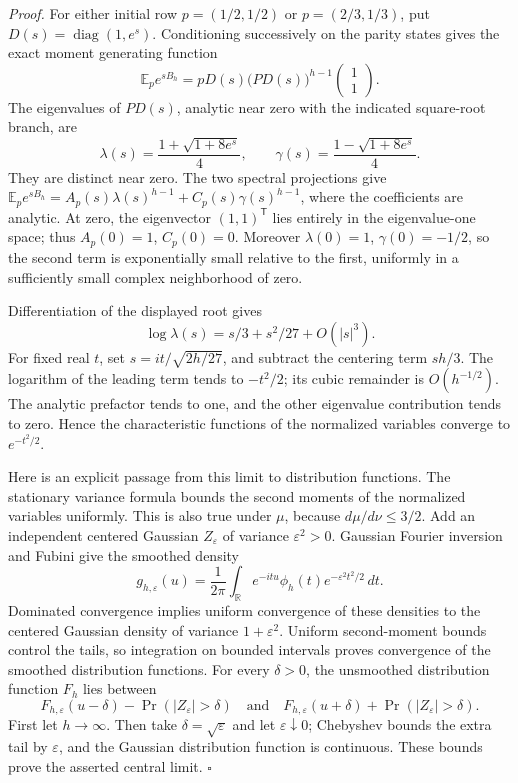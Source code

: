 \documentclass[11pt,letterpaper]{article}
\newcommand{\R}{\mathbb{R}}
\newenvironment{proof}{\noindent\textit{Proof.}}{\hfill\(\square\)}
\begin{document}
\begin{proof}
For either initial row \(p=(1/2,1/2)\) or \(p=(2/3,1/3)\), put
\(D(s)=\operatorname{diag}(1,e^s)\). Conditioning successively on
the parity states gives the exact moment generating function
\[
\mathbb E_p e^{sB_h}=pD(s)\bigl(PD(s)\bigr)^{h-1}
\begin{pmatrix}1\\1\end{pmatrix}.
\]
The eigenvalues of \(PD(s)\), analytic near zero with the indicated
square-root branch, are
\[
\lambda(s)=\frac{1+\sqrt{1+8e^s}}4,\qquad
\gamma(s)=\frac{1-\sqrt{1+8e^s}}4.
\]
They are distinct near zero. The two spectral projections give
\(\mathbb E_p e^{sB_h}
=A_p(s)\lambda(s)^{h-1}+C_p(s)\gamma(s)^{h-1}\),
where the coefficients are analytic. At zero, the eigenvector
\((1,1)^\mathsf{T}\) lies entirely in the eigenvalue-one space;
thus \(A_p(0)=1\), \(C_p(0)=0\).
Moreover \(\lambda(0)=1\), \(\gamma(0)=-1/2\), so the second
term is exponentially small relative to the first, uniformly in
a sufficiently small complex neighborhood of zero.

Differentiation of the displayed root gives
\[
\log\lambda(s)=s/3+s^2/27+O(|s|^3).
\]
For fixed real \(t\), set \(s=it/\sqrt{2h/27}\), and subtract the
centering term \(sh/3\). The logarithm of the leading term tends
to \(-t^2/2\); its cubic remainder is \(O(h^{-1/2})\).
The analytic prefactor tends to one, and the other eigenvalue
contribution tends to zero. Hence the characteristic functions
of the normalized variables converge to \(e^{-t^2/2}\).

Here is an explicit passage from this limit to distribution functions.
The stationary variance formula bounds the second moments of the
normalized variables uniformly. This is also true under \(\mu\),
because \(d\mu/d\nu\le3/2\). Add an independent centered Gaussian
\(Z_\varepsilon\) of variance \(\varepsilon^2>0\).
Gaussian Fourier inversion and Fubini give the smoothed density
\[
g_{h,\varepsilon}(u)=\frac1{2\pi}\int_\R
e^{-itu}\phi_h(t)e^{-\varepsilon^2t^2/2}\,dt.
\]
Dominated convergence implies uniform convergence of these
densities to the centered Gaussian density of variance
\(1+\varepsilon^2\). Uniform second-moment bounds control the
tails, so integration on bounded intervals proves convergence
of the smoothed distribution functions.
For every \(\delta>0\), the unsmoothed distribution function
\(F_h\) lies between
\[
F_{h,\varepsilon}(u-\delta)-\Pr(|Z_\varepsilon|>\delta)
\quad\text{and}\quad
F_{h,\varepsilon}(u+\delta)+\Pr(|Z_\varepsilon|>\delta).
\]
First let \(h\to\infty\). Then take \(\delta=\sqrt\varepsilon\)
and let \(\varepsilon\downarrow0\); Chebyshev bounds the extra
tail by \(\varepsilon\), and the Gaussian distribution function
is continuous. These bounds prove the asserted central limit.
\end{proof}
\end{document}

